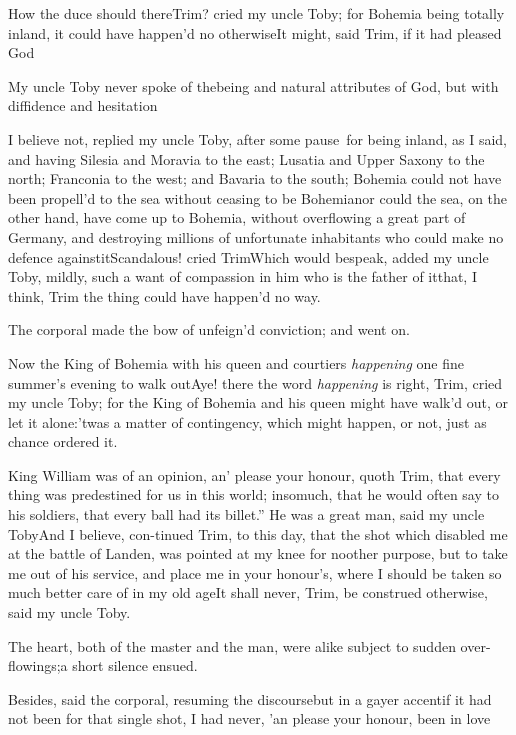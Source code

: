 \documentclass{article}
\begin{document}
How the duce should there\tsk Trim? cried my
uncle Toby; for Bohemia being totally inland, it
could have happen’d no otherwise\tsh It might, said
Trim, if it had pleased God\tsh

My uncle Toby never spoke of the\break being and natural
attributes of God, but with diffidence and
hesitation\tsh

\newpage
\tsk I believe not, replied my uncle Toby, after
some pause\tsk\ for being inland, as I said, and having
Silesia and Moravia to the east; Lusatia and
Upper Saxony to the north; Franconia to the
west; and Bavaria to the south; Bohemia could not
have been propell’d to the sea without ceasing to be
Bohemia\tsh nor could the sea, on the other hand,
have come up to Bohemia, without overflowing a great part of
Germany, and destroying millions of unfortunate inhabitants
who could make no defence against\break it\tsh Scandalous! cried
Trim\tsk Which would bespeak, added my uncle Toby,
mildly, such a want of compassion in him who is the father of
it\tsh that, I think, Trim \tsh the thing
could have happen’d no way.

\newpage
The corporal made the bow of unfeign’d conviction; and
went on.

Now the King of Bohemia with his queen and courtiers
\textit{happening} one fine summer’s evening to walk
out\tsh Aye! there the word \textit{happening} is right,
Trim, cried my uncle Toby; for the King of
Bohemia and his queen might have walk’d out, or let it
alone:\tsh ’twas a matter of contingency, which
might happen, or not, just as chance ordered it.

King William was of an opinion, an’ please your
honour, quoth Trim, that every thing was predestined for us
in this world; insomuch, that he would often say to his soldiers,
that \lqq every ball had its billet.” He was a great man,
said my uncle Toby\tsh And I believe, con-\pb tinued
Trim, to this day, that the shot which disabled me at the
battle of Landen, was pointed at my knee for no\break other
purpose, but to take me out of his service, and place me in your
honour’s, where I should be taken so much better care of in
my old age\tsh It shall never, Trim, be construed
otherwise, said my uncle Toby.

The heart, both of the master and the man, were alike subject to
sudden over-flowings;\tsh a short silence ensued.

Besides, said the corporal, resuming the discourse\tsk but in
a gayer accent\tsh if it had not been for that single
shot, I had never, ’an please your honour, been in
love\tsh
\end{document}
